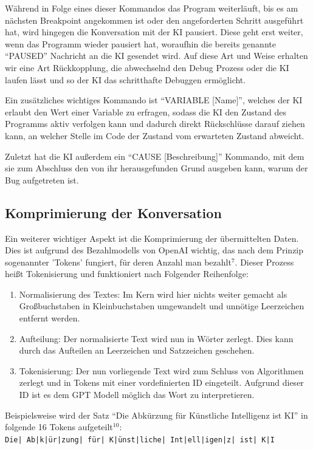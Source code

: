 \documentclass[a4paper,12pt,ngerman]{scrartcl}
\begin{document}
Während in Folge eines dieser Kommandos das Program weiterläuft, bis es am nächsten Breakpoint angekommen ist oder den angeforderten Schritt ausgeführt hat, wird hingegen die Konversation mit der KI pausiert. Diese geht erst weiter, wenn das Programm wieder pausiert hat, woraufhin die bereits genannte ``PAUSED'' Nachricht an die KI gesendet wird. Auf diese Art und Weise erhalten wir eine Art Rückkopplung, die abwechselnd den Debug Prozess oder die KI laufen lässt und so der KI das schritthafte Debuggen ermöglicht.

Ein zusätzliches wichtiges Kommando ist ``VARIABLE [Name]'', welches der KI erlaubt den Wert einer Variable zu erfragen, sodass die KI den Zustand des Programms aktiv verfolgen kann und dadurch direkt Rückschlüsse darauf ziehen kann, an welcher Stelle im Code der Zustand vom erwarteten Zustand abweicht.

Zuletzt hat die KI außerdem ein ``CAUSE [Beschreibung]'' Kommando, mit dem sie zum Abschluss den von ihr herausgefunden Grund ausgeben kann, warum der Bug aufgetreten ist.

\subsection{Komprimierung der Konversation}
\label{sec:compression}

Ein weiterer wichtiger Aspekt ist die Komprimierung der übermittelten Daten. Dies ist aufgrund des Bezahlmodells von OpenAI wichtig, das nach dem Prinzip sogenannter 'Tokens' fungiert, für deren Anzahl man bezahlt$^7$. Dieser Prozess heißt Tokenisierung und funktioniert nach Folgender Reihenfolge:
\begin{enumerate}
	\item Normalisierung des Textes: Im Kern wird hier nichts weiter gemacht als Großbuchstaben in Kleinbuchstaben umgewandelt und unnötige Leerzeichen entfernt werden.
	\item Aufteilung: Der normalisierte Text wird nun in Wörter zerlegt. Dies kann durch das Aufteilen an Leerzeichen und Satzzeichen geschehen.
	\item Tokenisierung: Der nun vorliegende Text wird zum Schluss von Algorithmen zerlegt und in Tokens mit einer vordefinierten ID eingeteilt. Aufgrund dieser ID ist es dem GPT Modell möglich das Wort zu interpretieren.
\end{enumerate}

Beispielsweise wird der Satz ``Die Abkürzung für Künstliche Intelligenz ist KI'' in folgende 16 Tokens aufgeteilt$^{10}$:\\
\texttt{Die| Ab|k|ür|zung| für| K|ünst|liche| Int|ell|igen|z| ist| K|I}
\end{document}
